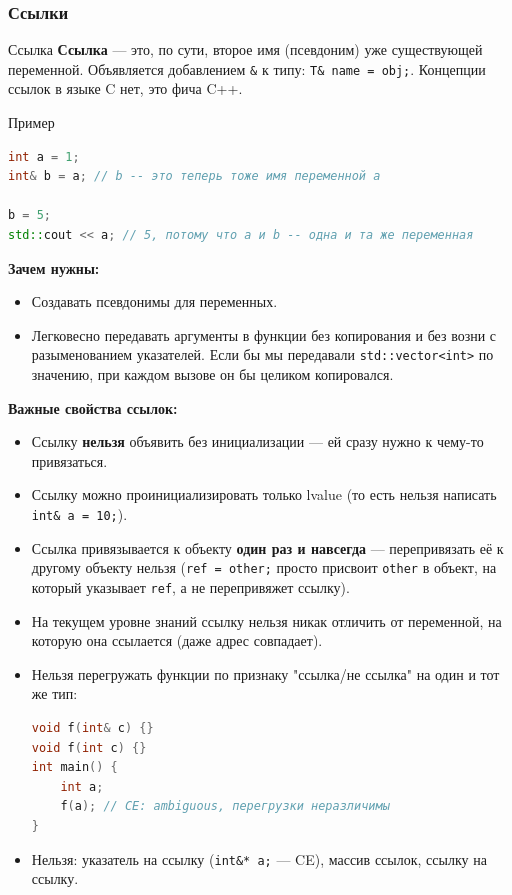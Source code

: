 \subsubsection{Ссылки}
\begin{definition}{Ссылка}{}
\textbf{Ссылка} --- это, по сути, второе имя (псевдоним) уже существующей переменной. Объявляется добавлением \texttt{\&} к типу: \texttt{T\& name = obj;}. Концепции ссылок в языке C нет, это фича C++.
\end{definition}
\begin{implementation}{Пример}{}
\begin{lstlisting}[language=C++]
int a = 1;
int& b = a; // b -- это теперь тоже имя переменной a

b = 5;
std::cout << a; // 5, потому что a и b -- одна и та же переменная
\end{lstlisting}
\end{implementation}
\textbf{Зачем нужны:}
\begin{itemize}
  \item Создавать псевдонимы для переменных.
  \item Легковесно передавать аргументы в функции без копирования и без возни с разыменованием указателей. Если бы мы передавали \texttt{std::vector<int>} по значению, при каждом вызове он бы целиком копировался.
\end{itemize}
\textbf{Важные свойства ссылок:}
\begin{itemize}
  \item Ссылку \textbf{нельзя} объявить без инициализации --- ей сразу нужно к чему-то привязаться.
  \item Ссылку можно проинициализировать только lvalue (то есть нельзя написать \texttt{int\& a = 10;}).
  \item Ссылка привязывается к объекту \textbf{один раз и навсегда} --- перепривязать её к другому объекту нельзя (\texttt{ref = other;} просто присвоит \texttt{other} в объект, на который указывает \texttt{ref}, а не перепривяжет ссылку).
  \item На текущем уровне знаний ссылку нельзя никак отличить от переменной, на которую она ссылается (даже адрес совпадает).
  \item Нельзя перегружать функции по признаку "ссылка/не ссылка" на один и тот же тип:
\begin{lstlisting}[language=C++]
void f(int& c) {}
void f(int c) {}
int main() {
    int a;
    f(a); // CE: ambiguous, перегрузки неразличимы
}
\end{lstlisting}
  \item Нельзя: указатель на ссылку (\texttt{int\&* a;} --- CE), массив ссылок, ссылку на ссылку.
\end{itemize}
